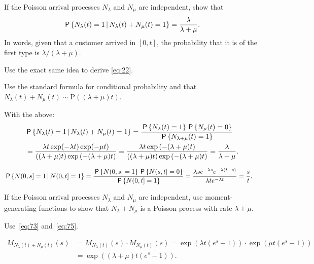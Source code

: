 \documentclass[stochastic-or.tex]{subfiles}
\begin{document}
\begin{exercise}\label{ex:30a}
 If the Poisson arrival processes $N_\lambda$ and $N_\mu$ are independent, show that
 \begin{equation*}
 \,\mathsf{P}\left\{N_\lambda(t) = 1 \,\middle|\, N_\lambda(t) + N_\mu(t) = 1\right\} =
\frac{\lambda}{\lambda+\mu}.
 \end{equation*}
In words,  given that a customer arrived in $[0,t]$, the probability that it is of the first type is $\lambda/(\lambda+\mu)$.

Use the exact same idea to derive \cref{eq:22}.
\begin{hint}
Use the standard formula for conditional probability and that $N_\lambda(t) + N_\mu(t) \sim \text{P}((\lambda + \mu)t)$.
\end{hint}
\begin{solution}
 With the above:
 \begin{align*}
& \,\mathsf{P}\left\{N_\lambda(t) = 1 \,\middle|\, N_\lambda(t) + N_\mu(t) = 1\right\}
= \frac{\,\mathsf{P}\left\{N_\lambda(t) = 1\right\}\,\mathsf{P}\left\{N_\mu(t) = 0\right\}}{\,\mathsf{P}\left\{N_{\lambda+\mu}(t) = 1\right\}} \\
&= \frac{\lambda t \exp(-\lambda t) \exp(-\mu t)}{((\lambda+\mu)t)\exp{(-(\lambda+\mu)t)}}
= \frac{\lambda t \exp{(-(\lambda + \mu)t)}}{((\lambda+\mu)t)\exp{(-(\lambda+\mu)t)}}
= \frac{\lambda}{\lambda+\mu}.
 \end{align*}

\begin{align*}
 \,\mathsf{P}\left\{N(0,s] =1\,\middle|\, N(0,t]=1\right\}
&= \frac{\,\mathsf{P}\left\{N(0,s] =1\right\}\,\mathsf{P}\left\{N(s,t]=0\right\}}{\,\mathsf{P}\left\{N(0,t]=1\right\}} = \frac{\lambda s e^{-\lambda s} e^{-\lambda (t-s)}}{\lambda t e^{-\lambda t}} = \frac s t.
\end{align*}
\end{solution}
\end{exercise}


\begin{exercise}\label{ex:41}
 If the Poisson arrival processes $N_\lambda$ and $N_\mu$ are independent, use moment-generating functions to show that $N_\lambda + N_\mu$ is a Poisson process with rate $\lambda + \mu$.
\begin{hint}
 Use~\cref{eq:73} and~\cref{eq:75}.
\end{hint}

\begin{solution}
\begin{align*}
M_{N_\lambda(t)+N_\mu(t)}(s)
&= M_{N_\lambda(t)}(s)\cdot M_{N_{\mu}(t)}(s)
=\exp(\lambda t (e^s -1))\cdot \exp(\mu t(e^s-1)) \\
&= \exp((\lambda + \mu)t (e^s-1)).
\end{align*}
\end{solution}
\end{exercise}
\end{document}
